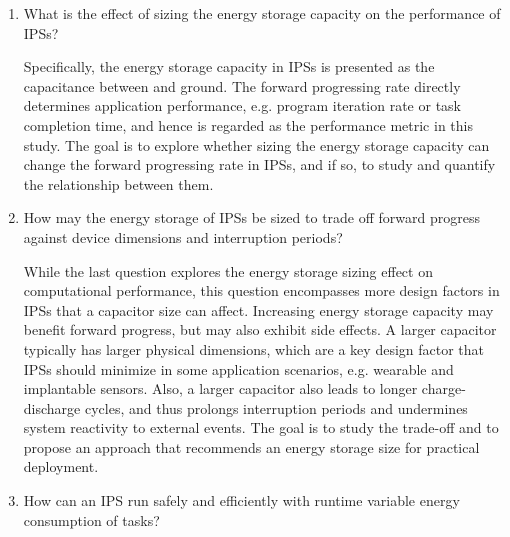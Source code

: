 \begin{enumerate}

\item What is the effect of sizing the energy storage capacity on the performance of IPSs? 

Specifically, the energy storage capacity in IPSs is presented as the capacitance between  and ground. 
The forward progressing rate directly determines application performance, e.g. program iteration rate or task completion time, and hence is regarded as the performance metric in this study. 
The goal is to explore whether sizing the energy storage capacity can change the forward progressing rate in IPSs, and if so, to study and quantify the relationship between them. 

\item How may the energy storage of IPSs be sized to trade off forward progress against device dimensions and interruption periods?

While the last question explores the energy storage sizing effect on computational performance, this question encompasses more design factors in IPSs that a capacitor size can affect. 
Increasing energy storage capacity may benefit forward progress, but may also exhibit side effects. 
A larger capacitor typically has larger physical dimensions, which are a key design factor that IPSs should minimize in some application scenarios, e.g. wearable and implantable sensors. 
Also, a larger capacitor also leads to longer charge-discharge cycles, and thus prolongs interruption periods and undermines system reactivity to external events. 
The goal is to study the trade-off and to propose an approach that recommends an energy storage size for practical deployment.

\item How can an IPS run safely and efficiently with runtime variable energy consumption of tasks?


\end{enumerate}
